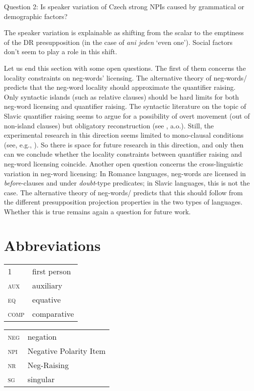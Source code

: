 \documentclass[output=paper,colorlinks,citecolor=brown]{langscibook}
\begin{document}
  
\ea\label{ex-24} Question 2: Is speaker variation of Czech strong NPIs caused by
grammatical or demographic factors?\z

  
\ea\label{ex-25} The speaker variation is explainable as shifting from the scalar to
  the emptiness of the DR presupposition (in the case of \emph{ani jeden}
  `even one'). \ea Social factors don't seem to play a role in this shift.\z\z
  
\noindent Let us end this section with some open questions. The first of them concerns the locality constraints on neg-words' licensing. The alternative theory of neg-words/\citet{ovalle2004double} predicts that the neg-word locality should approximate the quantifier raising. Only syntactic islands (such as relative clauses) should be hard limits for both neg-word licensing and quantifier raising. The syntactic literature on the topic of Slavic quantifier raising seems to argue for a possibility of overt movement (out of non-island clauses) but obligatory reconstruction (see \cite{neeleman2009focus}, a.o.). Still, the experimental research in this direction seems limited to mono-clausal conditions (see, e.g., \cite{ionin2018focus}). So there is space for future research in this direction, and only then can we conclude whether the locality constraints between quantifier raising and neg-word licensing coincide. Another open question concerns the cross-linguistic variation in neg-word licensing: In Romance languages, neg-words are licensed in \textit{before}-clauses and under \textit{doubt}-type predicates; in Slavic languages, this is not the case. The alternative theory of neg-words/\citet{ovalle2004double} predicts that this should follow from the different presupposition projection properties in the two types of languages. Whether this is true remains again a question for future work.
  
\section*{Abbreviations}

\begin{tabularx}{.5\textwidth}{@{}lQ}
\textsc{1}&first person\\
\textsc{aux}&auxiliary\\
\textsc{eq}&equative\\
\textsc{comp}&comparative\\

\end{tabularx}%
\begin{tabularx}{.5\textwidth}{lQ@{}}
\textsc{neg}&negation\\
\textsc{npi}&Negative Polarity Item\\
\textsc{nr}&Neg-Raising\\
\textsc{sg}&singular\\
    
\end{tabularx}
\end{document}
